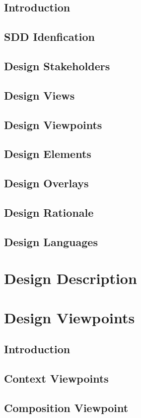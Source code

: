 \documentclass{article}
\begin{document}
\subsection{Introduction}
\subsection{SDD Idenfication}
\subsection{Design Stakeholders}
\subsection{Design Views}
\subsection{Design Viewpoints}
\subsection{Design Elements}
\subsection{Design Overlays}
\subsection{Design Rationale}
\subsection{Design Languages}

\section{Design Description}

\section{Design Viewpoints}

\subsection{Introduction}
\subsection{Context Viewpoints}
\subsection{Composition Viewpoint}
\end{document}
